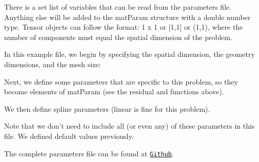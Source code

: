 There is a set list of variables that can be read from the parameters file. Anything else will be added to the {\ttfamily mat\-Param} structure with a double number type. Tensor objects can follow the format\-: 1 x 1 or \mbox{[}1,1\mbox{]} or (1,1), where the number of components must equal the spatial dimension of the problem.

In this example file, we begin by specifying the spatial dimension, the geometry dimensions, and the mesh size\-:


\begin{DoxyCodeInclude}

\end{DoxyCodeInclude}


Next, we define some parameters that are specific to this problem, so they become elements of {\ttfamily mat\-Param} (see the {\ttfamily residual} and  functions above).


\begin{DoxyCodeInclude}

\end{DoxyCodeInclude}


We then define spline parameters (linear is fine for this problem).


\begin{DoxyCodeInclude}

\end{DoxyCodeInclude}


Note that we don't need to include all (or even any) of these parameters in this file. We defined default values previously.

The complete parameters file can be found at \href{https://github.com/mechanoChem/mechanoChemIGA/blob/master/initBounValProbs/nonGradientMechanics/3D/parameters.prm}{\tt Github}. 